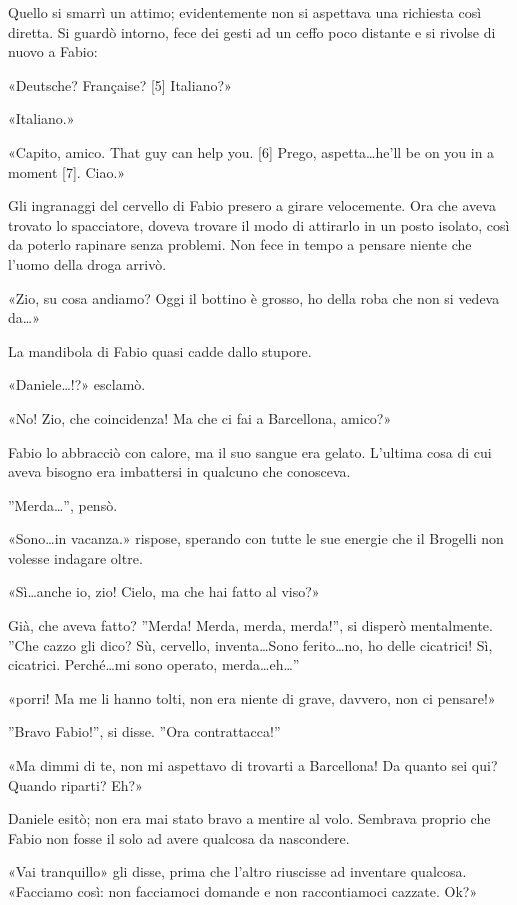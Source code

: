 Quello si smarrì un attimo; evidentemente non si aspettava una richiesta così diretta. Si guardò intorno, fece dei gesti ad un ceffo poco distante e si rivolse di nuovo a Fabio:

«Deutsche? Française? [5] Italiano?»

«Italiano.»

«Capito, amico. That guy can help you. [6] Prego, aspetta\ldots he'll be on you in a moment [7]. Ciao.»

Gli ingranaggi del cervello di Fabio presero a girare velocemente. Ora che aveva trovato lo spacciatore, doveva trovare il modo di attirarlo in un posto isolato, così da poterlo rapinare senza problemi. Non fece in tempo a pensare niente che l'uomo della droga arrivò.

«Zio, su cosa andiamo? Oggi il bottino è grosso, ho della roba che non si vedeva da\ldots»

La mandibola di Fabio quasi cadde dallo stupore.

«Daniele\ldots!?» esclamò.

«No! Zio, che coincidenza! Ma che ci fai a Barcellona, amico?»

Fabio lo abbracciò con calore, ma il suo sangue era gelato. L'ultima cosa di cui aveva bisogno era imbattersi in qualcuno che conosceva.

''Merda\ldots'', pensò.

«Sono\ldots in vacanza.» rispose, sperando con tutte le sue energie che il Brogelli non volesse indagare oltre.

«Sì\ldots anche io, zio! Cielo, ma che hai fatto al viso?»

Già, che aveva fatto? ''Merda! Merda, merda, merda!'', si disperò mentalmente. ''Che cazzo gli dico? Sù, cervello, inventa\ldots Sono ferito\ldots no, ho delle cicatrici! Sì, cicatrici. Perché\ldots mi sono operato\ldotsoh, merda\ldots eh\ldots''

«\ldotsdei porri! Ma me li hanno tolti, non era niente di grave, davvero, non ci pensare!»

''Bravo Fabio!'', si disse. ''Ora contrattacca!''

«Ma dimmi di te, non mi aspettavo di trovarti a Barcellona! Da quanto sei qui? Quando riparti? Eh?»

Daniele esitò; non era mai stato bravo a mentire al volo. Sembrava proprio che Fabio non fosse il solo ad avere qualcosa da nascondere.

«Vai tranquillo» gli disse, prima che l'altro riuscisse ad inventare qualcosa. «Facciamo così: non facciamoci domande e non raccontiamoci cazzate. Ok?»

